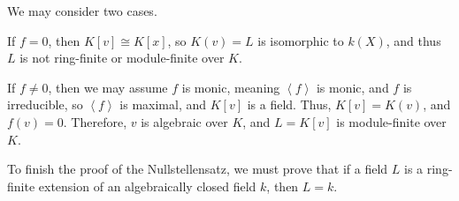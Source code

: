 \documentclass[10pt]{mypackage}
\begin{document}
We may consider two cases.
\begin{description}[font=\normalfont]
  \item[Case 1:] If $f = 0$, then $K\left[ v \right]\cong K\left[ x \right]$, so $K\left( v \right) = L$ is isomorphic to $k\left( X \right)$, and thus $L$ is not ring-finite or module-finite over $K$.
  \item[Case 2:] If $f\neq 0$, then we may assume $f$ is monic, meaning $\left\langle f \right\rangle$ is monic, and $f$ is irreducible, so $\left\langle f \right\rangle$ is maximal, and $K\left[ v \right]$ is a field. Thus, $K\left[ v \right] = K\left( v \right)$, and $f\left( v \right) = 0$. Therefore, $v$ is algebraic over $K$, and $L=K\left[ v \right]$ is module-finite over $K$.
\end{description}
To finish the proof of the Nullstellensatz, we must prove that if a field $L$ is a ring-finite extension of an algebraically closed field $k$, then $L = k$.\newline
\end{document}
